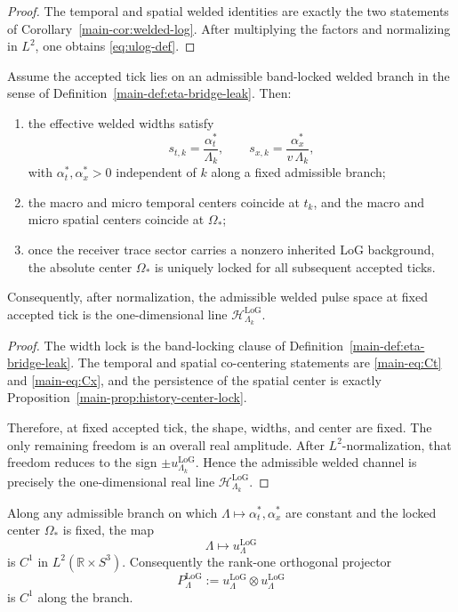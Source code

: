 \documentclass[11pt]{article}
\begin{document}
\begin{proof}
The temporal and spatial welded identities are exactly the two statements of
Corollary~\ref{main-cor:welded-log}. After multiplying the factors and normalizing in \(L^2\), one obtains
\eqref{eq:ulog-def}.
\end{proof}

\begin{proposition}
\label{prop:compressed-log-lock}
Assume the accepted tick lies on an admissible band-locked welded branch in the sense of
Definition~\ref{main-def:eta-bridge-leak}. Then:
\begin{enumerate}[leftmargin=2em]
\item the effective welded widths satisfy
\[
s_{t,k}=\frac{\alpha_t^\ast}{\Lambda_k},
\qquad
s_{x,k}=\frac{\alpha_x^\ast}{v\,\Lambda_k},
\]
with \(\alpha_t^\ast,\alpha_x^\ast>0\) independent of \(k\) along a fixed admissible branch;
\item the macro and micro temporal centers coincide at \(t_k\), and the macro and micro spatial
  centers coincide at \(\Omega_\ast\);
\item once the receiver trace sector carries a nonzero inherited LoG background, the absolute center
\(\Omega_\ast\) is uniquely locked for all subsequent accepted ticks.
\end{enumerate}
Consequently, after normalization, the admissible welded pulse space at fixed accepted tick is the
one-dimensional line \(\mathcal H^{\mathrm{LoG}}_{\Lambda_k}\).
\end{proposition}

\begin{proof}
The width lock is the band-locking clause of Definition~\ref{main-def:eta-bridge-leak}. The
temporal and spatial co-centering statements are \eqref{main-eq:Ct} and \eqref{main-eq:Cx}, and the
persistence of the spatial center is exactly Proposition~\ref{main-prop:history-center-lock}.

Therefore, at fixed accepted tick, the shape, widths, and center are fixed. The only remaining freedom
is an overall real amplitude. After \(L^2\)-normalization, that freedom reduces to the sign
\(\pm u^{\mathrm{LoG}}_{\Lambda_k}\). Hence the admissible welded channel is precisely the
one-dimensional real line \(\mathcal H^{\mathrm{LoG}}_{\Lambda_k}\).
\end{proof}

\begin{proposition}
\label{prop:compressed-log-smooth}
Along any admissible branch on which \(\Lambda\mapsto \alpha_t^\ast,\alpha_x^\ast\) are constant and
the locked center \(\Omega_\ast\) is fixed, the map
\[
\Lambda\longmapsto u^{\mathrm{LoG}}_\Lambda
\]
is \(C^1\) in \(L^2(\mathbb R\times S^3)\). Consequently the rank-one orthogonal projector
\begin{equation}
P^{\mathrm{LoG}}_\Lambda
:=
u^{\mathrm{LoG}}_\Lambda\otimes u^{\mathrm{LoG}}_\Lambda
\label{eq:Plog-def}
\end{equation}
is \(C^1\) along the branch.
\end{proposition}
\end{document}
